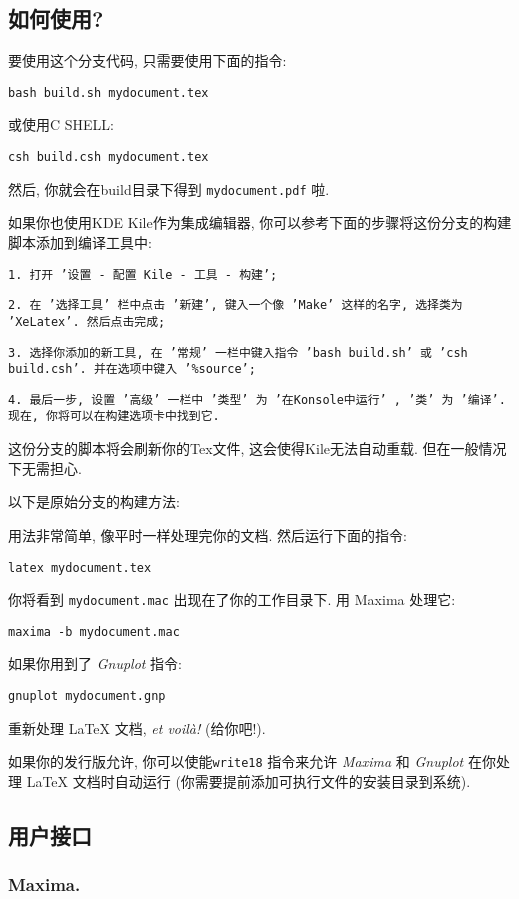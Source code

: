 \documentclass[11pt,a4paper]{article}
\def\Maxima{\emph{Maxima}}
\def\Gnuplot{\emph{Gnuplot}}
\begin{document}
\subsection{如何使用?}

要使用这个分支代码, 只需要使用下面的指令:

\texttt{bash build.sh mydocument.tex}

或使用C SHELL:

\texttt{csh build.csh mydocument.tex}

然后, 你就会在build目录下得到 \texttt{mydocument.pdf} 啦.

如果你也使用KDE Kile作为集成编辑器, 你可以参考下面的步骤将这份分支的构建脚本添加到编译工具中:

\texttt{1. 打开 '设置 - 配置 Kile - 工具 - 构建';}

\texttt{2. 在 '选择工具' 栏中点击 '新建', 键入一个像 'Make' 这样的名字, 选择类为 'XeLatex'. 然后点击完成;}

\texttt{3. 选择你添加的新工具, 在 '常规' 一栏中键入指令 'bash build.sh' 或 'csh build.csh'. 并在选项中键入 '\%source';}

\texttt{4. 最后一步, 设置 '高级' 一栏中 '类型' 为 '在Konsole中运行' , '类' 为 '编译'. 现在, 你将可以在构建选项卡中找到它.}

{这份分支的脚本将会刷新你的Tex文件, 这会使得Kile无法自动重载. 但在一般情况下无需担心.}

以下是原始分支的构建方法:

用法非常简单, 像平时一样处理完你的文档. 然后运行下面的指令:

\texttt{latex mydocument.tex}

你将看到 \texttt{mydocument.mac} 出现在了你的工作目录下. 用 Maxima 处理它:

\texttt{maxima -b mydocument.mac}

如果你用到了 \Gnuplot{} 指令:

\texttt{gnuplot mydocument.gnp}

重新处理 \LaTeX{} 文档, \textit{et voil\`a!} (给你吧!).

如果你的发行版允许, 你可以使能\texttt{write18} 指令来允许 \Maxima{} 和 \Gnuplot{} 在你处理 \LaTeX{} 文档时自动运行 (你需要提前添加可执行文件的安装目录到系统). 

\subsection{用户接口}
\subsubsection{Maxima.}
\end{document}
